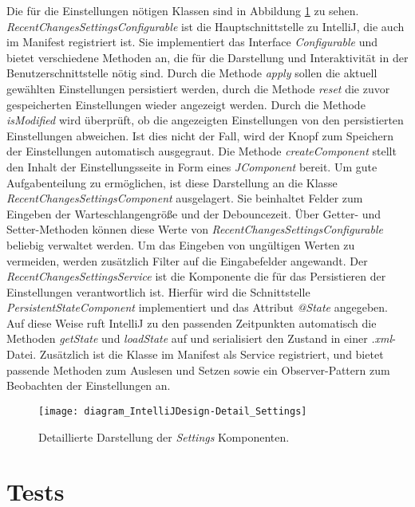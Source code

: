 Die für die Einstellungen nötigen Klassen sind in Abbildung
\ref{fig:diagram_IntelliJDesign-Detail_Settings} zu sehen.
\emph{RecentChangesSettingsConfigurable} ist die Hauptschnittstelle 
zu IntelliJ, die auch im Manifest registriert ist. 
Sie implementiert das Interface \emph{Configurable}
und bietet verschiedene Methoden an, die für die Darstellung
und Interaktivität in der Benutzerschnittstelle nötig sind.
Durch die Methode \emph{apply} sollen die aktuell gewählten Einstellungen
persistiert werden, durch die Methode \emph{reset} die 
zuvor gespeicherten Einstellungen wieder angezeigt werden.
Durch die Methode \emph{isModified} wird überprüft, ob die angezeigten
Einstellungen von den persistierten Einstellungen abweichen. 
Ist dies nicht der Fall, wird der Knopf zum Speichern der Einstellungen
automatisch ausgegraut. Die Methode \emph{createComponent} stellt
den Inhalt der Einstellungsseite in Form eines \emph{JComponent} bereit.
Um gute Aufgabenteilung zu ermöglichen, ist diese Darstellung an die 
Klasse \emph{RecentChangesSettingsComponent} ausgelagert. Sie beinhaltet
Felder zum Eingeben der Warteschlangengröße und der Debouncezeit.
Über Getter- und Setter-Methoden können diese Werte von 
\emph{RecentChangesSettingsConfigurable} beliebig verwaltet werden.
Um das Eingeben von ungültigen Werten zu vermeiden, werden zusätzlich
Filter auf die Eingabefelder angewandt.
Der \emph{RecentChangesSettingsService} ist die Komponente die für das 
Persistieren der Einstellungen verantwortlich ist. Hierfür
wird die Schnittstelle \emph{PersistentStateComponent} implementiert
und das Attribut \emph{@State} angegeben. Auf diese Weise ruft
IntelliJ zu den passenden Zeitpunkten automatisch die Methoden
\emph{getState} und \emph{loadState} auf und serialisiert den Zustand
in einer \emph{.xml}-Datei.
Zusätzlich ist die Klasse im Manifest als Service registriert, und bietet
passende Methoden zum Auslesen und Setzen sowie ein Observer-Pattern
zum Beobachten der Einstellungen an.

\begin{figure}
    \centering
    \texttt{[image: diagram\_IntelliJDesign-Detail\_Settings]}
    \caption{Detaillierte Darstellung der \emph{Settings} Komponenten.}
    \label{fig:diagram_IntelliJDesign-Detail_Settings}
\end{figure}

\section{Tests}
\label{sec:EntwicklungIntelliJ_Tests}

